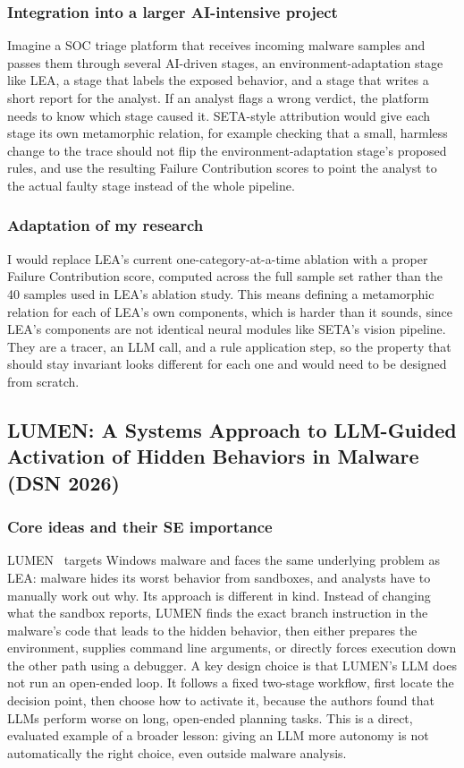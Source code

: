 \documentclass[11pt,a4paper]{article}
\begin{document}
\subsubsection{Integration into a larger AI-intensive project}

Imagine a SOC triage platform that receives incoming malware samples and passes them through several AI-driven stages, an environment-adaptation stage like LEA, a stage that labels the exposed behavior, and a stage that writes a short report for the analyst.
If an analyst flags a wrong verdict, the platform needs to know which stage caused it.
SETA-style attribution would give each stage its own metamorphic relation, for example checking that a small, harmless change to the trace should not flip the environment-adaptation stage's proposed rules, and use the resulting Failure Contribution scores to point the analyst to the actual faulty stage instead of the whole pipeline.

\subsubsection{Adaptation of my research}

I would replace LEA's current one-category-at-a-time ablation with a proper Failure Contribution score, computed across the full sample set rather than the 40 samples used in LEA's ablation study.
This means defining a metamorphic relation for each of LEA's own components, which is harder than it sounds, since LEA's components are not identical neural modules like SETA's vision pipeline.
They are a tracer, an LLM call, and a rule application step, so the property that should stay invariant looks different for each one and would need to be designed from scratch.

\subsection{LUMEN: A Systems Approach to LLM-Guided Activation of Hidden Behaviors in Malware (DSN 2026)}

\subsubsection{Core ideas and their SE importance}

LUMEN~\cite{lumen2026} targets Windows malware and faces the same underlying problem as LEA: malware hides its worst behavior from sandboxes, and analysts have to manually work out why.
Its approach is different in kind.
Instead of changing what the sandbox reports, LUMEN finds the exact branch instruction in the malware's code that leads to the hidden behavior, then either prepares the environment, supplies command line arguments, or directly forces execution down the other path using a debugger.
A key design choice is that LUMEN's LLM does not run an open-ended loop.
It follows a fixed two-stage workflow, first locate the decision point, then choose how to activate it, because the authors found that LLMs perform worse on long, open-ended planning tasks.
This is a direct, evaluated example of a broader lesson: giving an LLM more autonomy is not automatically the right choice, even outside malware analysis.
\end{document}
